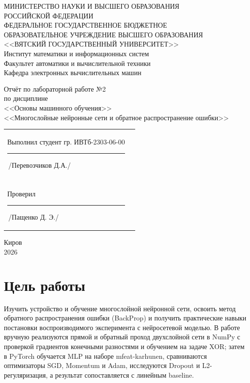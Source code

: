 \documentclass[oneside,a4paper,14pt]{extarticle}
\begin{document}
\newpage\thispagestyle{empty}
\begin{center}
	МИНИСТЕРСТВО НАУКИ И ВЫСШЕГО ОБРАЗОВАНИЯ\\
	РОССИЙСКОЙ ФЕДЕРАЦИИ\\
	ФЕДЕРАЛЬНОЕ ГОСУДАРСТВЕННОЕ БЮДЖЕТНОЕ\\
	ОБРАЗОВАТЕЛЬНОЕ УЧРЕЖДЕНИЕ ВЫСШЕГО ОБРАЗОВАНИЯ\\
	<<ВЯТСКИЙ ГОСУДАРСТВЕННЫЙ УНИВЕРСИТЕТ>>\\
	Институт математики и информационных систем\\
	Факультет автоматики и вычислительной техники\\
	Кафедра электронных вычислительных машин
\end{center}
\vspace{30mm}

\begin{center}
	Отчёт по лабораторной работе №2\\
	по дисциплине\\
	<<Основы машинного обучения>>\\
	<<Многослойные нейронные сети и обратное распространение ошибки>>\\
\end{center}
\vspace{40mm}

\noindent
\begin{tabular}{l r}
	Выполнил студент гр. ИВТб-2303-06-00 \hspace{10mm} \rule[-1mm]{20mm}{0.15mm}\,/Перевозчиков Д.А./ \\ \\
	Проверил \hspace{65mm} \rule[-1mm]{20mm}{0.15mm}\,/Пащенко Д. Э./
\end{tabular}

\vfill
\begin{center}
	Киров\\
	2026
\end{center}

\newpage

\section{Цель работы}
Изучить устройство и обучение многослойной нейронной сети, освоить метод обратного распространения ошибки (BackProp) и получить практические навыки постановки воспроизводимого эксперимента с нейросетевой моделью. В работе вручную реализуются прямой и обратный проход двухслойной сети в NumPy с проверкой градиентов конечными разностями и обучением на задаче XOR; затем в PyTorch обучается MLP на наборе mfeat-karhunen, сравниваются оптимизаторы SGD, Momentum и Adam, исследуются Dropout и L2-регуляризация, а результат сопоставляется с линейным baseline.
\end{document}
